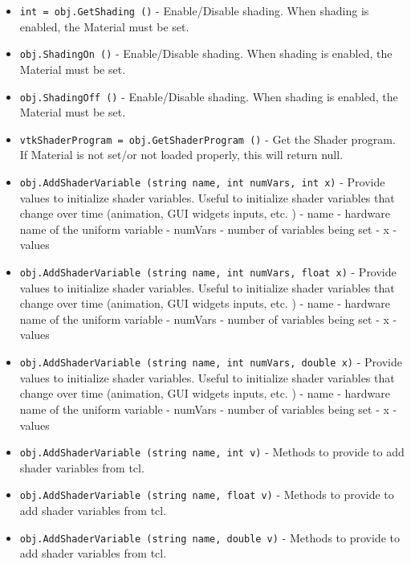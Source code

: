 \begin{itemize}
\item  \verb|int = obj.GetShading ()| -  Enable/Disable shading. When shading is enabled, the
 Material must be set.

\item  \verb|obj.ShadingOn ()| -  Enable/Disable shading. When shading is enabled, the
 Material must be set.

\item  \verb|obj.ShadingOff ()| -  Enable/Disable shading. When shading is enabled, the
 Material must be set.

\item  \verb|vtkShaderProgram = obj.GetShaderProgram ()| -  Get the Shader program. If Material is not set/or not loaded properly,
 this will return null.

\item  \verb|obj.AddShaderVariable (string name, int numVars, int x)| -  Provide values to initialize shader variables.
 Useful to initialize shader variables that change over time
 (animation, GUI widgets inputs, etc. )
 -  name - hardware name of the uniform variable
 -  numVars - number of variables being set
 -  x - values

\item  \verb|obj.AddShaderVariable (string name, int numVars, float x)| -  Provide values to initialize shader variables.
 Useful to initialize shader variables that change over time
 (animation, GUI widgets inputs, etc. )
 -  name - hardware name of the uniform variable
 -  numVars - number of variables being set
 -  x - values

\item  \verb|obj.AddShaderVariable (string name, int numVars, double x)| -  Provide values to initialize shader variables.
 Useful to initialize shader variables that change over time
 (animation, GUI widgets inputs, etc. )
 -  name - hardware name of the uniform variable
 -  numVars - number of variables being set
 -  x - values

\item  \verb|obj.AddShaderVariable (string name, int v)| -  Methods to provide to add shader variables from tcl.

\item  \verb|obj.AddShaderVariable (string name, float v)| -  Methods to provide to add shader variables from tcl.

\item  \verb|obj.AddShaderVariable (string name, double v)| -  Methods to provide to add shader variables from tcl.


\end{itemize}
